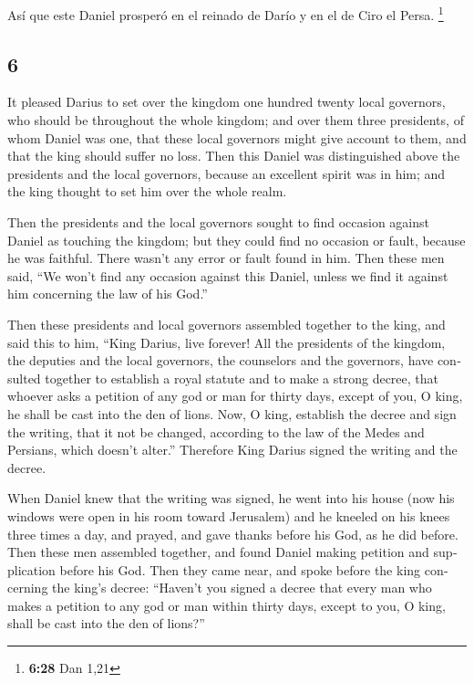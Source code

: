 \begin{paracol}{2}
 Así que este Daniel prosperó en el reinado de Darío y en
el de Ciro el Persa. \footnote{\textbf{6:28} Dan 1,21}

\switchcolumn
\begin{otherlanguage}{english}

\hypertarget{section-11}{%
\section{6}\label{section-11}}

 It pleased Darius to set over the kingdom one hundred
twenty local governors, who should be throughout the whole kingdom;
 and over them three presidents, of whom Daniel was one,
that these local governors might give account to them, and that the king
should suffer no loss.  Then this Daniel was distinguished
above the presidents and the local governors, because an excellent
spirit was in him; and the king thought to set him over the whole realm.

 Then the presidents and the local governors sought to
find occasion against Daniel as touching the kingdom; but they could
find no occasion or fault, because he was faithful. There wasn't any
error or fault found in him.  Then these men said, ``We
won't find any occasion against this Daniel, unless we find it against
him concerning the law of his God.''

 Then these presidents and local governors assembled
together to the king, and said this to him, ``King Darius, live forever!
 All the presidents of the kingdom, the deputies and the
local governors, the counselors and the governors, have consulted
together to establish a royal statute and to make a strong decree, that
whoever asks a petition of any god or man for thirty days, except of
you, O king, he shall be cast into the den of lions.  Now,
O king, establish the decree and sign the writing, that it not be
changed, according to the law of the Medes and Persians, which doesn't
alter.''  Therefore King Darius signed the writing and the
decree.

 When Daniel knew that the writing was signed, he went
into his house (now his windows were open in his room toward Jerusalem)
and he kneeled on his knees three times a day, and prayed, and gave
thanks before his God, as he did before.  Then these men
assembled together, and found Daniel making petition and supplication
before his God.  Then they came near, and spoke before
the king concerning the king's decree: ``Haven't you signed a decree
that every man who makes a petition to any god or man within thirty
days, except to you, O king, shall be cast into the den of lions?''


\end{otherlanguage}
\end{paracol}
